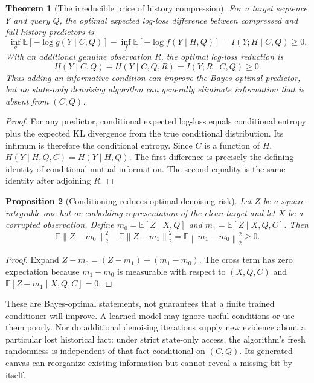 \documentclass{article}
\newtheorem{theorem}{Theorem}[section]
\newtheorem{proposition}[theorem]{Proposition}
\theoremstyle{remark}\newtheorem{remark}[theorem]{Remark}
\newcommand{\E}{\mathbb E}
\newcommand{\norm}[1]{\left\lVert #1\right\rVert}
\begin{document}
\begin{theorem}[The irreducible price of history compression]
\label{thm:information}
For a target sequence $Y$ and query $Q$, the optimal expected log-loss difference between compressed and full-history predictors is
\begin{equation}
 \inf_g\E[-\log g(Y\mid C,Q)]
 -\inf_f\E[-\log f(Y\mid H,Q)]
 =I(Y;H\mid C,Q)\ge0.
 \label{eq:informationgap}
\end{equation}
With an additional genuine observation $R$, the optimal log-loss reduction is
\begin{equation}
 H(Y\mid C,Q)-H(Y\mid C,Q,R)=I(Y;R\mid C,Q)\ge0.
 \label{eq:conditionalgain}
\end{equation}
Thus adding an informative condition can improve the Bayes-optimal predictor, but no state-only denoising algorithm can generally eliminate information that is absent from $(C,Q)$.
\end{theorem}
\begin{proof}
For any predictor, conditional expected log-loss equals conditional entropy plus the expected KL divergence from the true conditional distribution. Its infimum is therefore the conditional entropy. Since $C$ is a function of $H$,
$H(Y\mid H,Q,C)=H(Y\mid H,Q)$.
The first difference is precisely the defining identity of conditional mutual information. The second equality is the same identity after adjoining $R$.
\end{proof}

\begin{proposition}[Conditioning reduces optimal denoising risk]
\label{prop:risk}
Let $Z$ be a square-integrable one-hot or embedding representation of the clean target and let $X$ be a corrupted observation. Define $m_0=\E[Z\mid X,Q]$ and $m_1=\E[Z\mid X,Q,C]$. Then
\begin{equation}
 \E\norm{Z-m_0}_2^2-\E\norm{Z-m_1}_2^2
 =\E\norm{m_1-m_0}_2^2\ge0.
\end{equation}
\end{proposition}
\begin{proof}
Expand $Z-m_0=(Z-m_1)+(m_1-m_0)$. The cross term has zero expectation because $m_1-m_0$ is measurable with respect to $(X,Q,C)$ and $\E[Z-m_1\mid X,Q,C]=0$.
\end{proof}

These are Bayes-optimal statements, not guarantees that a finite trained conditioner will improve. A learned model may ignore useful conditions or use them poorly. Nor do additional denoising iterations supply new evidence about a particular lost historical fact: under strict state-only access, the algorithm's fresh randomness is independent of that fact conditional on $(C,Q)$. Its generated canvas can reorganize existing information but cannot reveal a missing bit by itself.
\end{document}
